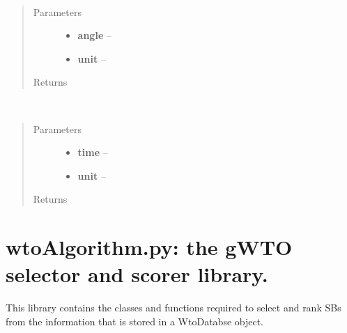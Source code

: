 \documentclass[a4paper,10pt,english]{sphinxmanual}
\begin{document}
\begin{fulllineitems}
\label{wtoapi:wtoDatabase.convert_sec}~\begin{quote}\begin{description}
\item[{Parameters}] \leavevmode\begin{itemize}
\item {} 
\textbf{angle} -- 

\item {} 
\textbf{unit} -- 

\end{itemize}

\item[{Returns}] \leavevmode


\end{description}\end{quote}

\end{fulllineitems}


\begin{fulllineitems}
\label{wtoapi:wtoDatabase.convert_tsec}~\begin{quote}\begin{description}
\item[{Parameters}] \leavevmode\begin{itemize}
\item {} 
\textbf{time} -- 

\item {} 
\textbf{unit} -- 

\end{itemize}

\item[{Returns}] \leavevmode


\end{description}\end{quote}

\end{fulllineitems}

\label{wtoapi:module-wtoAlgorithm}

\section{wtoAlgorithm.py: the gWTO selector and scorer library.}
\label{wtoapi:wtoalgorithm-py-the-gwto-selector-and-scorer-library}
This library contains the classes and functions required to select and rank
SBs from the information that is stored in a WtoDatabse object.
\end{document}
